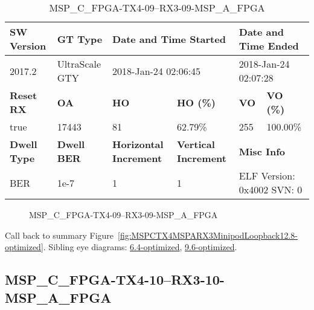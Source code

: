 \begin{table}[h]
\centering
\caption{MSP\_C\_FPGA-TX4-09--RX3-09-MSP\_A\_FPGA}
\label{tab:MSPCFPGATX409RX309MSPAFPGA12.8-optimized}
\begin{tabular}{@{}|l|l|l|l|l|l|@{}}
\toprule
\textbf{SW Version}                & \textbf{GT Type}   & \multicolumn{2}{l|}{\textbf{Date and Time Started}}            & \multicolumn{2}{l|}{\textbf{Date and Time Ended}}        \\ \midrule
2017.2                       & UltraScale GTY          & \multicolumn{2}{l|}{2018-Jan-24 02:06:45}                   & \multicolumn{2}{l|}{2018-Jan-24 02:07:28}               \\ \midrule
\textbf{Reset RX}                  & \textbf{OA} & \textbf{HO}   & \textbf{HO (\%)} & \textbf{VO} & \textbf{VO (\%)} \\ \midrule
true & 17443        & 81          & 62.79\%        & 255        & 100.00\%       \\ \midrule
\textbf{Dwell Type}                & \textbf{Dwell BER} & \textbf{Horizontal Increment} & \textbf{Vertical Increment}    & \multicolumn{2}{l|}{\textbf{Misc Info}}                  \\ \midrule
BER                            & 1e-7        & 1        & 1           & \multicolumn{2}{l|}{ELF Version: 0x4002 SVN: 0}                         \\ \bottomrule
\end{tabular}
\end{table}

\begin{figure}[h]
\caption{MSP\_C\_FPGA-TX4-09--RX3-09-MSP\_A\_FPGA} \label{fig:MSPCFPGATX409RX309MSPAFPGA12.8-optimized}
\end{figure}

Call back to summary Figure~\ref{fig:MSPCTX4MSPARX3MinipodLoopback12.8-optimized}.
Sibling eye diagrams: \hyperref[sec:MSPCFPGATX409RX309MSPAFPGA6.4-optimized]{6.4-optimized}, \hyperref[sec:MSPCFPGATX409RX309MSPAFPGA9.6-optimized]{9.6-optimized}.

\clearpage
\newpage


\subsection{MSP\_C\_FPGA-TX4-10--RX3-10-MSP\_A\_FPGA}\label{sec:MSPCFPGATX410RX310MSPAFPGA12.8-optimized}


